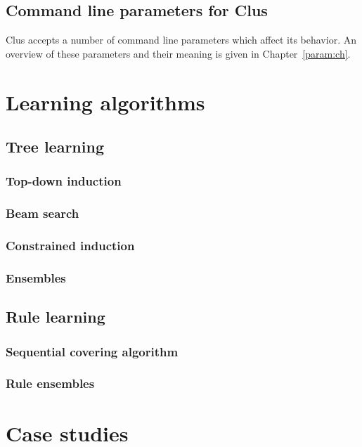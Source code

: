 \documentclass[a4paper]{report}
\begin{document}
\section{Command line parameters for Clus}

Clus accepts a number of command line parameters which affect its behavior.  An overview of these parameters and their meaning is given in Chapter~\ref{param:ch}.

\chapter{Learning algorithms}

\section{Tree learning}

\subsection{Top-down induction}

\subsection{Beam search}

\subsection{Constrained induction}

\subsection{Ensembles}

\section{Rule learning}

\subsection{Sequential covering algorithm}

\subsection{Rule ensembles}

\chapter{Case studies}
\end{document}

